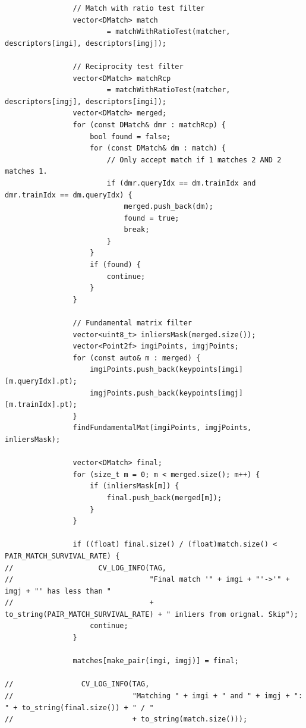 \documentclass[a4paper, 12pt]{article}
\begin{document}
\begin{lstlisting}
                // Match with ratio test filter
                vector<DMatch> match
                        = matchWithRatioTest(matcher, descriptors[imgi], descriptors[imgj]);

                // Reciprocity test filter
                vector<DMatch> matchRcp
                        = matchWithRatioTest(matcher, descriptors[imgj], descriptors[imgi]);
                vector<DMatch> merged;
                for (const DMatch& dmr : matchRcp) {
                    bool found = false;
                    for (const DMatch& dm : match) {
                        // Only accept match if 1 matches 2 AND 2 matches 1.
                        if (dmr.queryIdx == dm.trainIdx and dmr.trainIdx == dm.queryIdx) {
                            merged.push_back(dm);
                            found = true;
                            break;
                        }
                    }
                    if (found) {
                        continue;
                    }
                }

                // Fundamental matrix filter
                vector<uint8_t> inliersMask(merged.size());
                vector<Point2f> imgiPoints, imgjPoints;
                for (const auto& m : merged) {
                    imgiPoints.push_back(keypoints[imgi][m.queryIdx].pt);
                    imgjPoints.push_back(keypoints[imgj][m.trainIdx].pt);
                }
                findFundamentalMat(imgiPoints, imgjPoints, inliersMask);

                vector<DMatch> final;
                for (size_t m = 0; m < merged.size(); m++) {
                    if (inliersMask[m]) {
                        final.push_back(merged[m]);
                    }
                }

                if ((float) final.size() / (float)match.size() < PAIR_MATCH_SURVIVAL_RATE) {
//                    CV_LOG_INFO(TAG,
//                                "Final match '" + imgi + "'->'" + imgj + "' has less than "
//                                + to_string(PAIR_MATCH_SURVIVAL_RATE) + " inliers from orignal. Skip");
                    continue;
                }

                matches[make_pair(imgi, imgj)] = final;

//                CV_LOG_INFO(TAG,
//                            "Matching " + imgi + " and " + imgj + ": " + to_string(final.size()) + " / "
//                            + to_string(match.size()));


\end{lstlisting}
\end{document}
